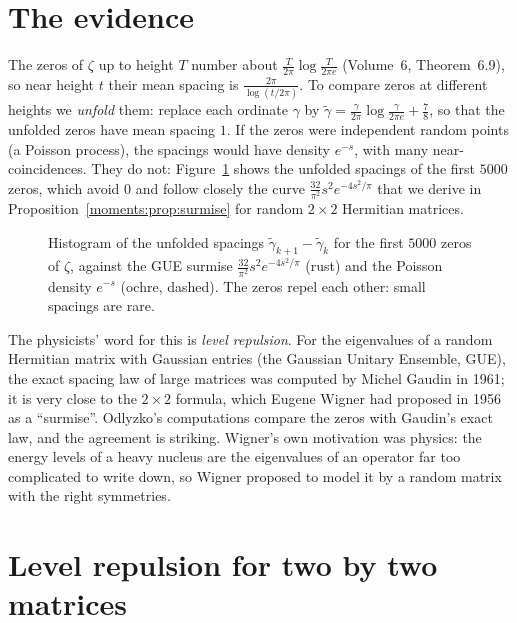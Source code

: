 \section{The evidence}

The zeros of $\zeta$ up to height $T$ number about $\frac T{2\pi}\log\frac T{2\pi e}$ (Volume~6, Theorem~6.9), so near height $t$ their mean spacing is
$\frac{2\pi}{\log(t/2\pi)}$. To compare zeros at different heights we \emph{unfold} them: replace each ordinate $\gamma$ by
$\tilde\gamma=\frac\gamma{2\pi}\log\frac\gamma{2\pi e}+\frac78$, so that the unfolded zeros have mean spacing $1$. If the zeros were independent random points
(a Poisson process), the spacings would have density $e^{-s}$, with many near-coincidences. They do not: Figure~\ref{moments:fig:spacings} shows the unfolded
spacings of the first $5000$ zeros, which avoid $0$ and follow closely the curve $\frac{32}{\pi^2}s^2e^{-4s^2/\pi}$ that we derive in
Proposition~\ref{moments:prop:surmise} for random $2\times2$ Hermitian matrices.

\begin{figure}[ht]
\centering
{}
\caption{Histogram of the unfolded spacings $\tilde\gamma_{k+1}-\tilde\gamma_k$ for the first $5000$ zeros of $\zeta$, against the GUE surmise
$\frac{32}{\pi^2}s^2e^{-4s^2/\pi}$ (rust) and the Poisson density $e^{-s}$ (ochre, dashed). The zeros repel each other: small spacings are rare.}
\label{moments:fig:spacings}
\end{figure}

The physicists' word for this is \emph{level repulsion}. For the eigenvalues of a random Hermitian matrix with Gaussian entries (the Gaussian Unitary
Ensemble, GUE), the exact spacing law of large matrices was computed by Michel Gaudin in 1961; it is very close to the $2\times2$ formula, which Eugene
Wigner had proposed in 1956 as a ``surmise''. Odlyzko's computations compare the zeros with Gaudin's exact law, and the agreement is striking. Wigner's own motivation was physics: the energy levels of a heavy nucleus are the eigenvalues of an operator far too
complicated to write down, so Wigner proposed to model it by a random matrix with the right symmetries.

\section{Level repulsion for two by two matrices}

